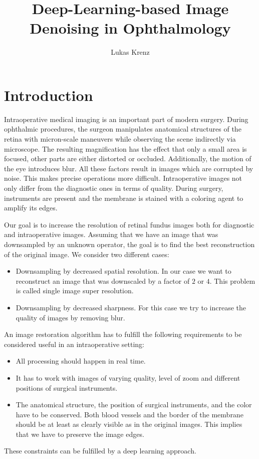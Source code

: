 \documentclass{scrartcl}
\begin{document}
\title{Deep-Learning-based Image Denoising in Ophthalmology}
\author{Lukas Krenz}

\maketitle

\section{Introduction}
Intraoperative medical imaging is an important part of modern surgery.
During ophthalmic procedures, the surgeon manipulates anatomical structures of the retina with micron-scale maneuvers while observing the scene indirectly via microscope.
The resulting magnification has the effect that only a small area is focused, other parts are either distorted or occluded.
Additionally, the motion of the eye introduces blur.
All these factors result in images which are corrupted by noise.
This makes precise operations more difficult.
Intraoperative images not only differ from the diagnostic ones in terms of quality.
During surgery, instruments are present and the membrane is stained with a coloring agent to amplify its edges.

Our goal is to increase the resolution of retinal fundus images both for diagnostic and intraoperative images.
Assuming that we have an image that was downsampled by an unknown operator, the goal is to find the best reconstruction of the original image.
We consider two different cases:
\begin{itemize}
\item Downsampling by decreased spatial resolution.
  In our case we want to reconstruct an image that was downscaled by a factor of $2$ or $4$.
  This problem is called single image super resolution.
\item Downsampling by decreased sharpness.
  For this case we try to increase the quality of images by removing blur.
\end{itemize}

An image restoration algorithm has to fulfill the following requirements to be considered useful in an intraoperative setting:
\begin{itemize}
\item All processing should happen in real time.
\item It has to work with images of varying quality, level of zoom and different positions of surgical instruments.
\item The anatomical structure, the position of surgical instruments, and the color have to be conserved.
Both blood vessels and the border of the membrane should be at least as clearly visible as in the original images.
This implies that we have to preserve the image edges.
\end{itemize}
These constraints can be fulfilled by a deep learning approach.
\end{document}
